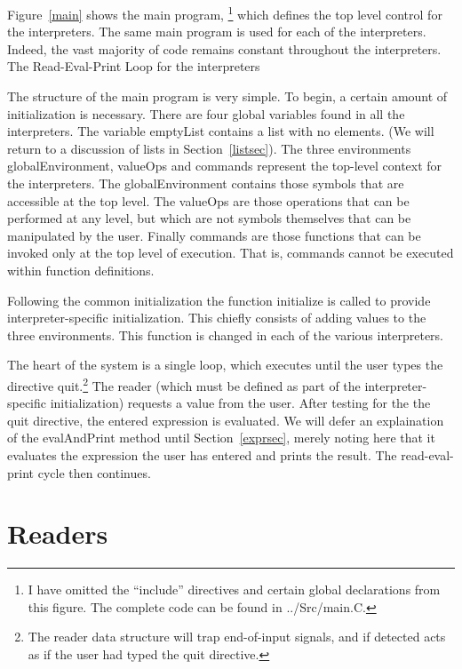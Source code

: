 Figure~\ref{main} shows the main program, \footnote{I have omitted the
    ``include'' directives and certain global declarations from this figure.
    The complete code can be found in ../Src/main.C.}  which defines the top
level control for the interpreters.  The same main program is used for each of
the interpreters.  Indeed, the vast majority of code remains constant throughout
the interpreters.
%
{The Read-Eval-Print Loop for the interpreters}

The structure of the main program is very simple.  To begin, a certain amount of
initialization is necessary.  There are four global variables found in all the
interpreters.  The variable {\sf emptyList} contains a list with no elements.
(We will return to a discussion of lists in Section~\ref{listsec}).  The three
environments {\sf globalEnvironment}, {\sf valueOps} and {\sf commands}
represent the top-level context for the interpreters.  The {\sf
    globalEnvironment} contains those symbols that are accessible at the top
level.  The {\sf valueOps} are those operations that can be performed at any
level, but which are not symbols themselves that can be manipulated by the user.
Finally {\sf commands} are those functions that can be invoked only at the top
level of execution.  That is, commands cannot be executed within function
definitions.

Following the common initialization the function {\sf initialize} is called to
provide interpreter-specific initialization.  This chiefly consists of adding
values to the three environments.  This function is changed in each of the
various interpreters.

The heart of the system is a single loop, which executes until the user types
the directive {\sf quit}.\footnote{The reader data structure will trap
    end-of-input signals, and if detected acts as if the user had typed the {\sf
        quit} directive.}  The reader (which must be defined as part of the
interpreter-specific initialization) requests a value from the user.  After
testing for the the {\sf quit} directive, the entered expression is evaluated.
We will defer an explaination of the {\sf evalAndPrint} method until
Section~\ref{exprsec}, merely noting here that it evaluates the expression the
user has entered and prints the result.  The read-eval-print cycle then
continues.

\section{Readers}

